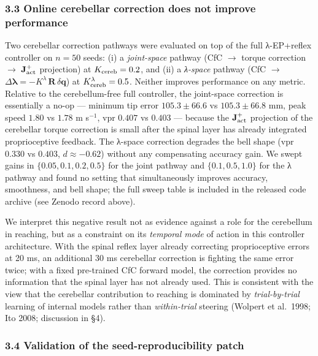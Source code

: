 \documentclass[
  11pt,
]{article}
\begin{document}
\hypertarget{online-cerebellar-correction-does-not-improve-performance}{%
\subsubsection{3.3 Online cerebellar correction does not improve
performance}\label{online-cerebellar-correction-does-not-improve-performance}}

Two cerebellar correction pathways were evaluated on top of the full
λ-EP+reflex controller on \(n = 50\) seeds: (i) a \emph{joint-space}
pathway (CfC \(\to\) torque correction \(\to\)
\(\mathbf{J}_{\rm act}^{+}\) projection) at \(K_{\rm cereb} = 0.2\), and
(ii) a \emph{λ-space} pathway (CfC \(\to\)
\(\Delta\boldsymbol{\lambda} = -K^{\lambda}\,\mathbf{R}\,\delta\mathbf{q}\))
at \(K_{\rm cereb}^{\lambda} = 0.5\). Neither improves performance on
any metric. Relative to the cerebellum-free full controller, the
joint-space correction is essentially a no-op --- minimum tip error
\(105.3 \pm 66.6\) vs \(105.3 \pm 66.8\) mm, peak speed \(1.80\) vs
\(1.78\) m s\(^{-1}\), vpr \(0.407\) vs \(0.403\) --- because the
\(\mathbf{J}_{\rm act}^{+}\) projection of the cerebellar torque
correction is small after the spinal layer has already integrated
proprioceptive feedback. The λ-space correction degrades the bell shape
(vpr \(0.330\) vs \(0.403\), \(d \approx -0.62\)) without any
compensating accuracy gain. We swept gains in
\(\{0.05, 0.1, 0.2, 0.5\}\) for the joint pathway and
\(\{0.1, 0.5, 1.0\}\) for the λ pathway and found no setting that
simultaneously improves accuracy, smoothness, and bell shape; the full
sweep table is included in the released code archive (see Zenodo record
above).

We interpret this negative result not as evidence against a role for the
cerebellum in reaching, but as a constraint on its \emph{temporal mode}
of action in this controller architecture. With the spinal reflex layer
already correcting proprioceptive errors at 20 ms, an additional 30 ms
cerebellar correction is fighting the same error twice; with a fixed
pre-trained CfC forward model, the correction provides no information
that the spinal layer has not already used. This is consistent with the
view that the cerebellar contribution to reaching is dominated by
\emph{trial-by-trial} learning of internal models rather than
\emph{within-trial} steering (Wolpert et al.~1998; Ito 2008; discussion
in §4).

\hypertarget{validation-of-the-seed-reproducibility-patch}{%
\subsubsection{3.4 Validation of the seed-reproducibility
patch}\label{validation-of-the-seed-reproducibility-patch}}
\end{document}
